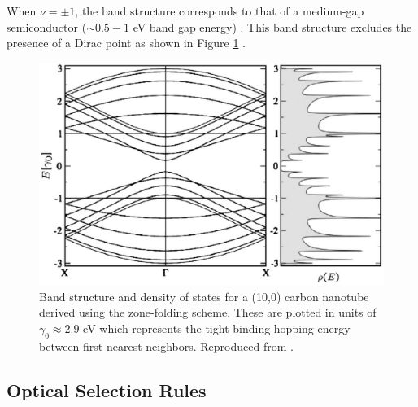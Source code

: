 When $\nu= \pm 1$, the band structure corresponds to that of a medium-gap semiconductor ($\sim0.5 - 1$ eV band gap energy) \cite{nanot2012optoelectronic}. This band structure excludes the presence of a Dirac point as shown in Figure \ref{fig:ten_zero_cnt}  \cite{charlier2007electronic}.



\begin{figure}[ht]
	\centering
	\includegraphics[scale=0.33]{images/chapter_optical_props/ten_zero_band_charlier}
	\caption{Band structure and density of states for a (10,0) carbon nanotube derived using the zone-folding scheme. These are plotted in units of $\gamma_0 \approx 2.9$ eV which represents the tight-binding hopping energy between first nearest-neighbors. Reproduced from \cite{charlier2007electronic}.}
	\label{fig:ten_zero_cnt}
\end{figure}


\subsection{Optical Selection Rules}
\label{section:selection_rules}

